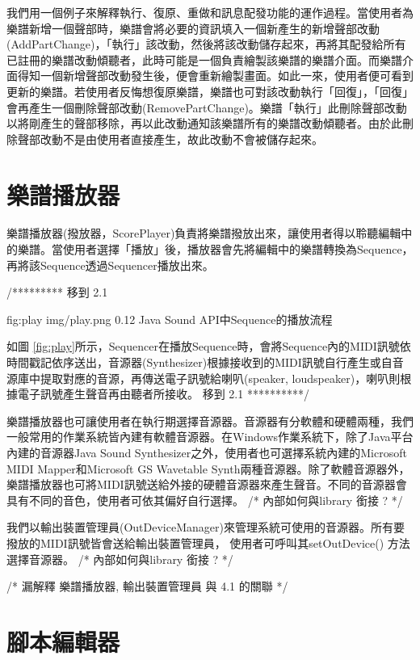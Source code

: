 \documentclass[12pt,a4paper,oneside]{report}
\begin{document}
我們用一個例子來解釋執行、復原、重做和訊息配發功能的運作過程。當使用者為樂譜新增一個聲部時，樂譜會將必要的資訊填入一個新產生的新增聲部改動(AddPartChange)，「執行」該改動，然後將該改動儲存起來，再將其配發給所有已註冊的樂譜改動傾聽者，此時可能是一個負責繪製該樂譜的樂譜介面。而樂譜介面得知一個新增聲部改動發生後，便會重新繪製畫面。如此一來，使用者便可看到更新的樂譜。若使用者反悔想復原樂譜，樂譜也可對該改動執行「回復」，「回復」會再產生一個刪除聲部改動(RemovePartChange)。樂譜「執行」此刪除聲部改動以將剛產生的聲部移除，再以此改動通知該樂譜所有的樂譜改動傾聽者。由於此刪除聲部改動不是由使用者直接產生，故此改動不會被儲存起來。

\section{樂譜播放器} %
\label{sec:scorePlayer}

樂譜播放器(撥放器，ScorePlayer)負責將樂譜撥放出來，讓使用者得以聆聽編輯中的樂譜。當使用者選擇「播放」後，播放器會先將編輯中的樂譜轉換為Sequence，再將該Sequence透過Sequencer播放出來。

/*********  移到 2.1 

\figurewithcaption
{fig:play}
{img/play.png}
{0.12}
{Java Sound API中Sequence的播放流程}

如圖 \ref{fig:play}所示，Sequencer在播放Sequence時，會將Sequence內的MIDI訊號依時間戳記依序送出，音源器(Synthesizer)根據接收到的MIDI訊號自行產生或自音源庫中提取對應的音源，再傳送電子訊號給喇叭(speaker, loudspeaker)，喇叭則根據電子訊號產生聲音再由聽者所接收。
移到 2.1    **********/ 


樂譜播放器也可讓使用者在執行期選擇音源器。音源器有分軟體和硬體兩種，我們一般常用的作業系統皆內建有軟體音源器。在Windows作業系統下，除了Java平台內建的音源器Java Sound Synthesizer之外，使用者也可選擇系統內建的Microsoft MIDI Mapper和Microsoft GS Wavetable Synth兩種音源器。除了軟體音源器外，樂譜播放器也可將MIDI訊號送給外接的硬體音源器來產生聲音。不同的音源器會具有不同的音色，使用者可依其偏好自行選擇。 /* 內部如何與library 銜接 ?  */

我們以輸出裝置管理員(OutDeviceManager)來管理系統可使用的音源器。所有要撥放的MIDI訊號皆會送給輸出裝置管理員， 使用者可呼叫其setOutDevice() 方法選擇音源器。 /* 內部如何與library 銜接 ?  */

/*  漏解釋 樂譜播放器, 輸出裝置管理員 與 4.1 的關聯  */




\section{腳本編輯器} %
\label{sec:scriptEditor}
\end{document}
